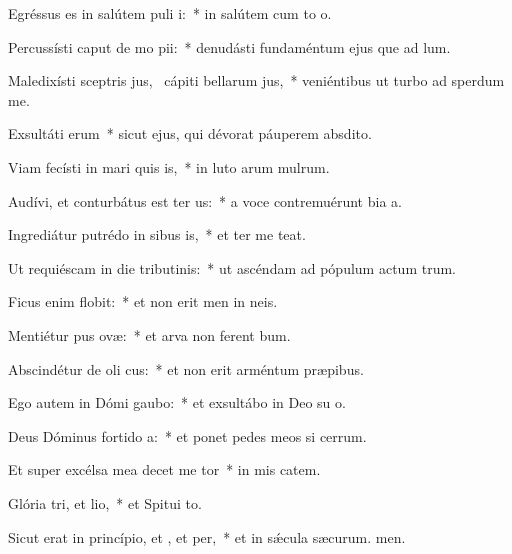 \item Egréssus es in salútem puli i:~* in salútem cum to o.
\item Percussísti caput de mo pii:~* denudásti fundaméntum ejus que ad lum.
\item Maledixísti sceptris jus,~\pscross{} cápiti bellarum jus,~* veniéntibus ut turbo ad sperdum me.
\item Exsultáti erum~* sicut ejus, qui dévorat páuperem  absdito.
\item Viam fecísti in mari quis is,~* in luto arum mulrum.
\item Audívi, et conturbátus est ter us:~* a voce contremuérunt bia a.
\item Ingrediátur putrédo in sibus is,~* et ter me teat.
\item Ut requiéscam in die tributinis:~* ut ascéndam ad pópulum actum trum.
\item Ficus enim  flobit:~* et non erit men in neis.
\item Mentiétur pus ovæ:~* et arva non ferent bum.
\item Abscindétur de oli cus:~* et non erit arméntum  præpibus.
\item Ego autem in Dómi gaubo:~* et exsultábo in Deo su o.
\item Deus Dóminus fortido a:~* et ponet pedes meos si cerrum.
\item Et super excélsa mea decet me tor~* in mis catem.
\item Glória tri, et lio,~* et Spitui to.
\item Sicut erat in princípio, et , et per,~* et in sǽcula sæcurum. men.
